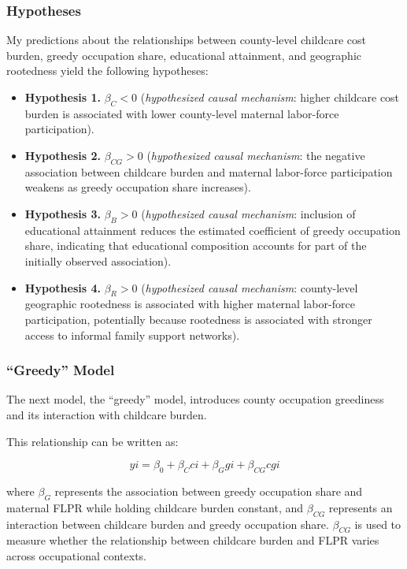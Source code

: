 \documentclass[
  letterpaper,
  DIV=11,
  numbers=noendperiod]{scrartcl}
\providecommand{\tightlist}{%
  \setlength{\itemsep}{0pt}\setlength{\parskip}{0pt}}
\begin{document}
\subsubsection{Hypotheses}\label{hypotheses}

My predictions about the relationships between county-level childcare
cost burden, greedy occupation share, educational attainment, and
geographic rootedness yield the following hypotheses:

\begin{itemize}
\tightlist
\item
  \textbf{Hypothesis 1.} \(\beta_{C} < 0\) (\emph{hypothesized causal
  mechanism}: higher childcare cost burden is associated with lower
  county-level maternal labor-force participation).
\item
  \textbf{Hypothesis 2.} \(\beta_{CG} > 0\) (\emph{hypothesized causal
  mechanism}: the negative association between childcare burden and
  maternal labor-force participation weakens as greedy occupation share
  increases).
\item
  \textbf{Hypothesis 3.} \(\beta_{B} > 0\) (\emph{hypothesized causal
  mechanism}: inclusion of educational attainment reduces the estimated
  coefficient of greedy occupation share, indicating that educational
  composition accounts for part of the initially observed association).
\item
  \textbf{Hypothesis 4.} \(\beta_{R} > 0\) (\emph{hypothesized causal
  mechanism}: county-level geographic rootedness is associated with
  higher maternal labor-force participation, potentially because
  rootedness is associated with stronger access to informal family
  support networks).
\end{itemize}

\subsubsection{``Greedy'' Model}\label{greedy-model}

The next model, the ``greedy'' model, introduces county occupation
greediness and its interaction with childcare burden.

This relationship can be written as:

\[
yi = \beta_0 + \beta_{C}ci + \beta_{G}gi + \beta_{CG}cgi
\]

where \(\beta_G\) represents the association between greedy occupation
share and maternal FLPR while holding childcare burden constant, and
\(\beta_{CG}\) represents an interaction between childcare burden and
greedy occupation share. \(\beta_{CG}\) is used to measure whether the
relationship between childcare burden and FLPR varies across
occupational contexts.
\end{document}

